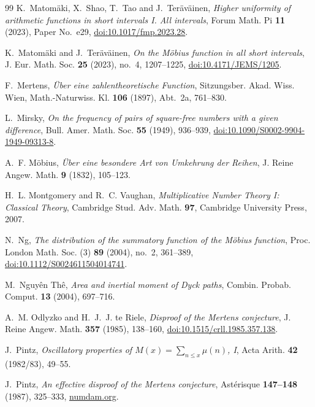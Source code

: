\documentclass[11pt,reqno]{amsart}
\numberwithin{equation}{section}
\theoremstyle{plain}
\theoremstyle{definition}
\theoremstyle{remark}
\begin{document}
\begin{thebibliography}{99}
K.~Matom\"aki, X.~Shao, T.~Tao and J.~Ter\"av\"ainen, \emph{Higher uniformity
of arithmetic functions in short intervals I. All intervals}, Forum Math.
Pi \textbf{11} (2023), Paper No.~e29,
\href{https://doi.org/10.1017/fmp.2023.28}{doi:10.1017/fmp.2023.28}.

K.~Matom\"aki and J.~Ter\"av\"ainen, \emph{On the M\"obius function in all
short intervals}, J. Eur. Math. Soc. \textbf{25} (2023), no.~4, 1207--1225,
\href{https://doi.org/10.4171/JEMS/1205}{doi:10.4171/JEMS/1205}.

F.~Mertens, \emph{\"Uber eine zahlentheoretische Function}, Sitzungsber.
Akad. Wiss. Wien, Math.-Naturwiss. Kl. \textbf{106} (1897), Abt.~2a,
761--830.

L.~Mirsky, \emph{On the frequency of pairs of square-free numbers with a
given difference}, Bull. Amer. Math. Soc. \textbf{55} (1949), 936--939,
\href{https://doi.org/10.1090/S0002-9904-1949-09313-8}{doi:10.1090/S0002-9904-1949-09313-8}.

A.~F. M\"obius, \emph{\"Uber eine besondere Art von Umkehrung der Reihen},
J. Reine Angew. Math. \textbf{9} (1832), 105--123.

H.~L. Montgomery and R.~C. Vaughan, \emph{Multiplicative Number Theory I:
Classical Theory}, Cambridge Stud. Adv. Math. \textbf{97}, Cambridge
University Press, 2007.

N.~Ng, \emph{The distribution of the summatory function of the M\"obius
function}, Proc. London Math. Soc. (3) \textbf{89} (2004), no.~2, 361--389,
\href{https://doi.org/10.1112/S0024611504014741}{doi:10.1112/S0024611504014741}.

M.~Nguy\^en Th\^e, \emph{Area and inertial moment of Dyck paths}, Combin.
Probab. Comput. \textbf{13} (2004), 697--716.

A.~M. Odlyzko and H.~J.~J. te Riele, \emph{Disproof of the Mertens
conjecture}, J. Reine Angew. Math. \textbf{357} (1985), 138--160,
\href{https://doi.org/10.1515/crll.1985.357.138}{doi:10.1515/crll.1985.357.138}.

J.~Pintz, \emph{Oscillatory properties of $M(x)=\sum_{n\le x}\mu(n)$, I},
Acta Arith. \textbf{42} (1982/83), 49--55.

J.~Pintz, \emph{An effective disproof of the Mertens conjecture}, Ast\'erisque
\textbf{147--148} (1987), 325--333,
\href{https://www.numdam.org/article/AST_1987__147-148__325_0.pdf}{numdam.org}.


\end{thebibliography}
\end{document}
